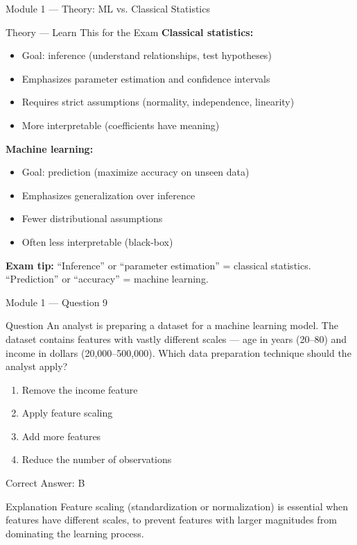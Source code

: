 \documentclass[aspectratio=169,10pt]{beamer}
\newcommand{\question}[1]{%
	\begin{block}{Question}
		#1
	\end{block}
}
\newcommand{\options}[4]{%
	\begin{enumerate}[label=\Alph*.,leftmargin=*]
		\item #1
		\item #2
		\item #3
		\item #4
	\end{enumerate}
}
\newcommand{\answerbox}[1]{%
	\begin{exampleblock}{Correct Answer: #1}
	\end{exampleblock}
}
\newcommand{\explain}[1]{%
	\begin{block}{Explanation}
		\small #1
	\end{block}
}
\newcommand{\theory}[1]{%
	\begin{block}{Theory --- Learn This for the Exam}
		\small #1
	\end{block}
}
\begin{document}
	\begin{frame}{Module 1 --- Theory: ML vs. Classical Statistics}
		\theory{
			\textbf{Classical statistics:}
			\begin{itemize}
				\item Goal: inference (understand relationships, test hypotheses)
				\item Emphasizes parameter estimation and confidence intervals
				\item Requires strict assumptions (normality, independence, linearity)
				\item More interpretable (coefficients have meaning)
			\end{itemize}
			\textbf{Machine learning:}
			\begin{itemize}
				\item Goal: prediction (maximize accuracy on unseen data)
				\item Emphasizes generalization over inference
				\item Fewer distributional assumptions
				\item Often less interpretable (black-box)
			\end{itemize}
			\textbf{Exam tip:} ``Inference'' or ``parameter estimation'' = classical statistics. ``Prediction'' or ``accuracy'' = machine learning.
		}
	\end{frame}
	
	\begin{frame}{Module 1 --- Question 9}
		\question{An analyst is preparing a dataset for a machine learning model. The dataset contains features with vastly different scales --- age in years (20--80) and income in dollars (20,000--500,000). Which data preparation technique should the analyst apply?}
		\options{Remove the income feature}{Apply feature scaling}{Add more features}{Reduce the number of observations}
		\answerbox{B}
		\explain{Feature scaling (standardization or normalization) is essential when features have different scales, to prevent features with larger magnitudes from dominating the learning process.}
	\end{frame}
	
\end{document}
